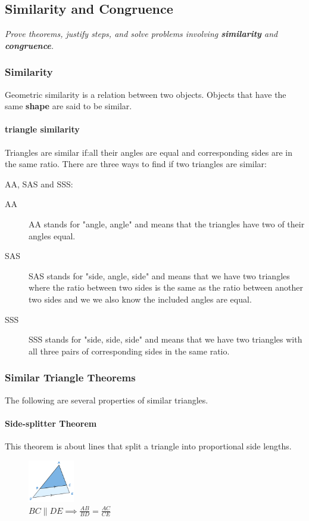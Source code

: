 \subsection{Similarity and Congruence}


\textit{Prove theorems, justify steps, and solve problems involving \textbf{similarity} and \textbf{congruence}.}

\vspace{.5cm}



\subsubsection[similarity]{Similarity} 

Geometric similarity is a relation between two objects. Objects that have the same \textbf{shape} are said to be similar.

\paragraph*{triangle similarity} 

Triangles are similar if:all their angles are equal and corresponding sides are in the same ratio. There are three ways to find if two triangles are similar: 

AA, SAS and SSS:

\begin{description}
    \item[AA] AA stands for "angle, angle" and means that the triangles have two of their angles equal.
    \item[SAS] SAS stands for "side, angle, side" and means that we have two triangles where the ratio between two sides is the same as the ratio between another two sides and we we also know the included angles are equal. 
    \item[SSS] SSS stands for "side, side, side" and means that we have two triangles with all three pairs of corresponding sides in the same ratio. 
\end{description}

\subsubsection*{Similar Triangle Theorems}


The following are several properties of similar triangles. 

\paragraph*{Side-splitter Theorem}
This theorem is about lines that split a triangle into proportional side lengths.
\begin{figure}[h!]
    \centering
    \includegraphics[width=2cm]{./public/images/side-splitter-theorem}
    \caption[side-splitter]{$BC \parallel DE \implies \frac{AB}{BD} = \frac{AC}{CE}$}
\end{figure}


